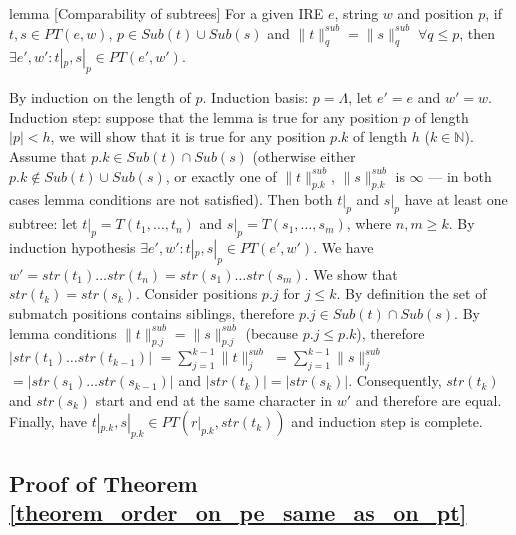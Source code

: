 \documentclass[AMA,STIX1COL]{WileyNJD-v2}
\newcommand{\YN}{\mathbb{N}}
\newcommand{\PT}{PT}
\newcommand{\snorm}[2]{\|{#1}\|^{sub}_{#2}}
\begin{document}
\begin{theoremEnd}{lemma}
[Comparability of subtrees]
    \label{lemma_subtrees}
    For a given IRE $e$, string $w$ and position $p$,
    if $t, s \in \PT(e, w)$, $p \in Sub(t) \cup Sub(s)$ and $\snorm{t}{q} = \snorm{s}{q} \; \forall q \leq p$,
    then $\exists e', w' : t|_p, s|_p \in \PT(e', w')$.
\end{theoremEnd}
\begin{proofEnd}
    By induction on the length of $p$.
    Induction basis: $p = \Lambda$, let $e' = e$ and $w' = w$.
    Induction step: suppose that the lemma is true for any position $p$ of length
    $|p| < h$, we will show that it is true for any position $p.k$ of length $h$
    ($k \in \YN$).
    Assume that $p.k \in Sub(t) \cap Sub(s)$
    (otherwise either $p.k \not\in Sub(t) \cup Sub(s)$,
    or exactly one of $\snorm{t}{p.k}$, $\snorm{s}{p.k}$ is $\infty$ --- in both
    cases lemma conditions are not satisfied).
    Then both $t|_p$ and $s|_p$ have at least one subtree: let
    $t|_{p} = T(t_1, \dots, t_n)$ and
    $s|_{p} = T(s_1, \dots, s_m)$, where $n, m \geq k$.
    By induction hypothesis $\exists e', w' : t|_p, s|_p \in \PT(e', w')$.
    We have $w' = str(t_1) \dots str(t_n) = str(s_1) \dots str(s_m)$.
    We show that $str(t_k) = str(s_k)$.
    Consider positions $p.j$ for $j \leq k$.
    By definition the set of submatch positions contains siblings,
    therefore $p.j \in Sub(t) \cap Sub(s)$.
    By lemma conditions $\snorm{t}{p.j} = \snorm{s}{p.j}$ (because $p.j \leq p.k$),
    therefore $|str(t_1) \dots str(t_{k-1})|$
    $= \sum\nolimits_{j=1}^{k-1}\snorm{t}{j}$
    $= \sum\nolimits_{j=1}^{k-1}\snorm{s}{j}$
    $= |str(s_1) \dots str(s_{k-1})|$ and
    $|str(t_k)| = |str(s_k)|$.
    Consequently, $str(t_k)$ and $str(s_k)$ start and end at the same character in $w'$ and therefore are equal.
    Finally, have $t|_{p.k}, s|_{p.k} \in \PT(r|_{p.k}, str(t_k))$ and induction step is complete.
\end{proofEnd}



\subsection*{Proof of Theorem \ref{theorem_order_on_pe_same_as_on_pt}}
\end{document}
